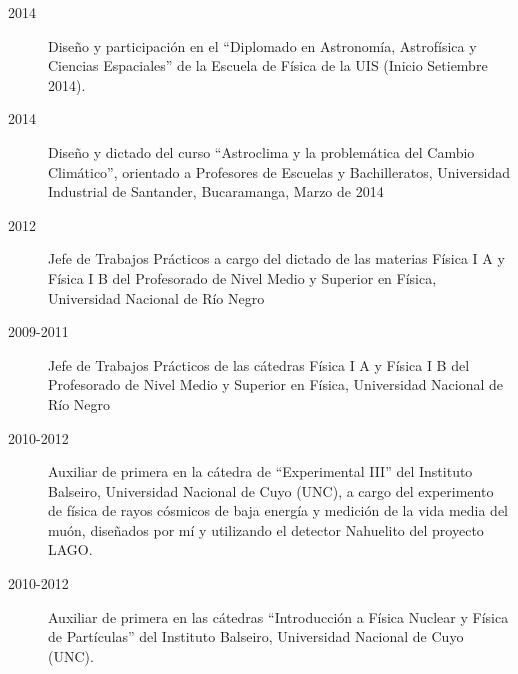 \begin{description}
    \item [2014] Diseño y participación en el ``Diplomado en Astronomía, Astrofísica y Ciencias Espaciales'' de la Escuela de Física de la UIS (Inicio Setiembre 2014).
	\item [2014] Diseño y dictado del curso ``Astroclima y la problemática del Cambio Climático'', orientado a Profesores de Escuelas y Bachilleratos, Universidad Industrial de Santander, Bucaramanga, Marzo de 2014
	\item [2012] Jefe de Trabajos Prácticos a cargo del dictado de las materias Física I A y Física I B del Profesorado de Nivel Medio y Superior en Física, Universidad Nacional de Río Negro
	\item [2009-2011] Jefe de Trabajos Prácticos de las cátedras Física I A y Física I B del Profesorado de Nivel Medio y Superior en Física, Universidad Nacional de Río Negro
	\item [2010-2012] Auxiliar de primera en la cátedra de ``Experimental III'' del Instituto Balseiro, Universidad Nacional de Cuyo (UNC), a cargo del experimento de física de rayos cósmicos de baja energía y medición de la vida media del muón, diseñados por mí y utilizando el detector Nahuelito del proyecto LAGO.
	\item [2010-2012] Auxiliar de primera en las cátedras ``Introducción a Física Nuclear y Física de Partículas'' del Instituto Balseiro, Universidad Nacional de Cuyo (UNC).
\fi
\end{description}
\fi